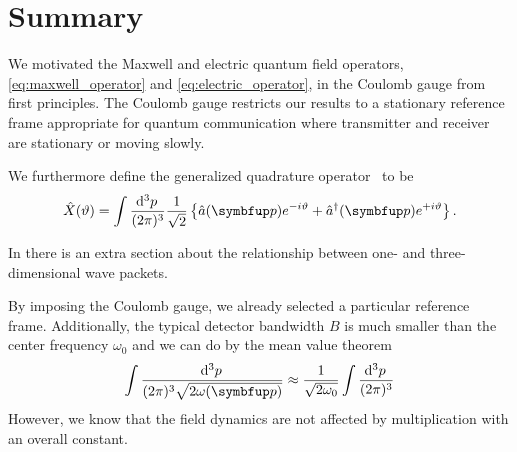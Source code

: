 \section*{Summary}

We motivated the Maxwell and electric quantum field operators, \cref{eq:maxwell_operator} and \cref{eq:electric_operator}, in the Coulomb gauge from first principles.
The Coulomb gauge restricts our results to a stationary reference frame appropriate for quantum communication where transmitter and receiver are stationary or moving slowly.





We furthermore define the generalized quadrature operator~\cite[p.~79]{Barnett2002} to be
\begin{equation}
	\hat{X}(\vartheta)
	=
	\int\frac{\dd[3]{p}}{(2\pi)^3}
	\frac{1}{\sqrt{2}}
	\left\{
		\hat{a}(\vb{p})
		e^{-i\vartheta}
		+
		\hat{a}^\dagger(\vb{p})
		e^{+i\vartheta}
	\right\}
	\label{eq:quadrature_operator}
	.
\end{equation}

In \cite[p.~53]{Cohen2019} there is an extra section about the relationship between one- and three-dimensional wave packets.

By imposing the Coulomb gauge, we already selected a particular reference frame.
Additionally, the typical detector bandwidth $B$ is much smaller than the center frequency $\omega_0$ and we can do by the mean value theorem
\begin{equation}
	\int
	\frac{\dd[3]{p}}{(2\pi)^3\sqrt{2\omega(\vb{p})}}
	\approx
	\frac{1}{\sqrt{2\omega_0}}
	\int
	\frac{\dd[3]{p}}{(2\pi)^3}
\end{equation}
However, we know that the field dynamics are not affected by multiplication with an overall constant.